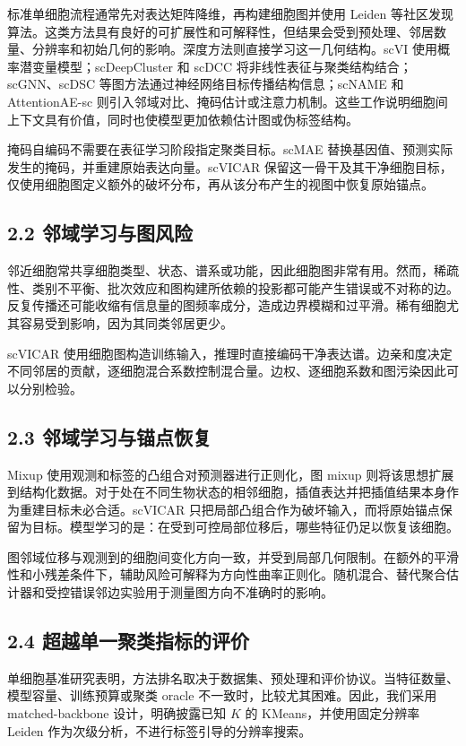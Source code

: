 \documentclass[journal]{IEEEtran}
\begin{document}
标准单细胞流程通常先对表达矩阵降维，再构建细胞图并使用 Leiden 等社区发现算法。这类方法具有良好的可扩展性和可解释性，但结果会受到预处理、邻居数量、分辨率和初始几何的影响。深度方法则直接学习这一几何结构。scVI 使用概率潜变量模型；scDeepCluster 和 scDCC 将非线性表征与聚类结构结合；scGNN、scDSC 等图方法通过神经网络目标传播结构信息；scNAME 和 AttentionAE-sc 则引入邻域对比、掩码估计或注意力机制。这些工作说明细胞间上下文具有价值，同时也使模型更加依赖估计图或伪标签结构。

掩码自编码不需要在表征学习阶段指定聚类目标。scMAE 替换基因值、预测实际发生的掩码，并重建原始表达向量。scVICAR 保留这一骨干及其干净细胞目标，仅使用细胞图定义额外的破坏分布，再从该分布产生的视图中恢复原始锚点。

\subsection{2.2 邻域学习与图风险}

邻近细胞常共享细胞类型、状态、谱系或功能，因此细胞图非常有用。然而，稀疏性、类别不平衡、批次效应和图构建所依赖的投影都可能产生错误或不对称的边。反复传播还可能收缩有信息量的图频率成分，造成边界模糊和过平滑。稀有细胞尤其容易受到影响，因为其同类邻居更少。

scVICAR 使用细胞图构造训练输入，推理时直接编码干净表达谱。边亲和度决定不同邻居的贡献，逐细胞混合系数控制混合量。边权、逐细胞系数和图污染因此可以分别检验。

\subsection{2.3 邻域学习与锚点恢复}

Mixup 使用观测和标签的凸组合对预测器进行正则化，图 mixup 则将该思想扩展到结构化数据。对于处在不同生物状态的相邻细胞，插值表达并把插值结果本身作为重建目标未必合适。scVICAR 只把局部凸组合作为破坏输入，而将原始锚点保留为目标。模型学习的是：在受到可控局部位移后，哪些特征仍足以恢复该细胞。

图邻域位移与观测到的细胞间变化方向一致，并受到局部几何限制。在额外的平滑性和小残差条件下，辅助风险可解释为方向性曲率正则化。随机混合、替代聚合估计器和受控错误邻边实验用于测量图方向不准确时的影响。

\subsection{2.4 超越单一聚类指标的评价}

单细胞基准研究表明，方法排名取决于数据集、预处理和评价协议。当特征数量、模型容量、训练预算或聚类 oracle 不一致时，比较尤其困难。因此，我们采用 matched-backbone 设计，明确披露已知 $K$ 的 KMeans，并使用固定分辨率 Leiden 作为次级分析，不进行标签引导的分辨率搜索。
\end{document}
